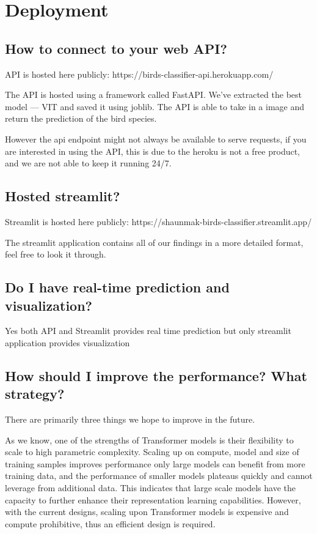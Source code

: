 \section{Deployment}

\subsection{How to connect to your web API?}
API is hosted here publicly: https://birds-classifier-api.herokuapp.com/

The API is hosted using a framework called FastAPI. We've extracted the best model --- VIT and saved it using joblib. The API is able to take in a image and return the prediction of the bird species.

However the api endpoint might not always be available to serve requests, if you are interested in using the API, this is due to the heroku is not a free product, and we are not able to keep it running 24/7. 

\subsection{Hosted streamlit?}
Streamlit is hosted here publicly: https://shaunmak-birds-classifier.streamlit.app/

The streamlit application contains all of our findings in a more detailed format, feel free to look it through.

\subsection{Do I have real-time prediction and visualization?}
Yes both API and Streamlit provides real time prediction but only streamlit application provides visualization

\subsection{How should I improve the performance? What strategy?}
There are primarily three things we hope to improve in the future.

As we know, one of the strengths of Transformer models is their flexibility to scale to high parametric complexity. Scaling up on compute, model and size of training samples improves performance only large models can benefit from more training data, and the performance of smaller models plateaus quickly and cannot leverage from additional data. This indicates that large scale models have the capacity to further enhance their representation learning capabilities. However, with the current designs, scaling upon Transformer models is expensive and compute prohibitive, thus an efficient design is required.

